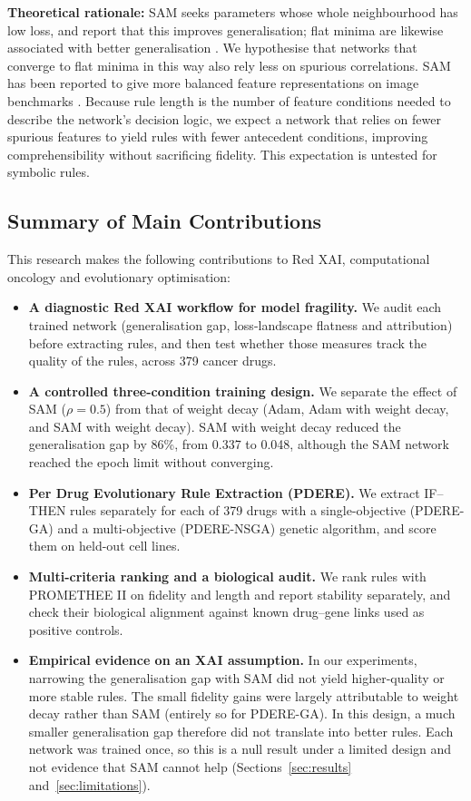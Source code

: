 \textbf{Theoretical rationale:} SAM seeks parameters whose whole neighbourhood has low loss, and \citet{foret2021} report that this improves generalisation; flat minima are likewise associated with better generalisation \citep{li2018}. We hypothesise that networks that converge to flat minima in this way also rely less on spurious correlations. SAM has been reported to give more balanced feature representations on image benchmarks \citep{springer2024}. Because rule length is the number of feature conditions needed to describe the network's decision logic, we expect a network that relies on fewer spurious features to yield rules with fewer antecedent conditions, improving comprehensibility without sacrificing fidelity. This expectation is untested for symbolic rules.

\subsection{Summary of Main Contributions}\label{sec:contributions}
This research makes the following contributions to Red XAI, computational oncology and evolutionary optimisation:
\begin{itemize}
  \item \textbf{A diagnostic Red XAI workflow for model fragility.} We audit each trained network (generalisation gap, loss-landscape flatness and attribution) before extracting rules, and then test whether those measures track the quality of the rules, across 379 cancer drugs.
  \item \textbf{A controlled three-condition training design.} We separate the effect of SAM ($\rho = 0.5$) from that of weight decay (Adam, Adam with weight decay, and SAM with weight decay). SAM with weight decay reduced the generalisation gap by 86\%, from 0.337 to 0.048, although the SAM network reached the epoch limit without converging.
  \item \textbf{Per Drug Evolutionary Rule Extraction (PDERE).} We extract IF--THEN rules separately for each of 379 drugs with a single-objective (PDERE-GA) and a multi-objective (PDERE-NSGA) genetic algorithm, and score them on held-out cell lines.
  \item \textbf{Multi-criteria ranking and a biological audit.} We rank rules with PROMETHEE II on fidelity and length and report stability separately, and check their biological alignment against known drug--gene links used as positive controls.
  \item \textbf{Empirical evidence on an XAI assumption.} In our experiments, narrowing the generalisation gap with SAM did not yield higher-quality or more stable rules. The small fidelity gains were largely attributable to weight decay rather than SAM (entirely so for PDERE-GA). In this design, a much smaller generalisation gap therefore did not translate into better rules. Each network was trained once, so this is a null result under a limited design and not evidence that SAM cannot help (Sections~\ref{sec:results} and~\ref{sec:limitations}).
\end{itemize}

